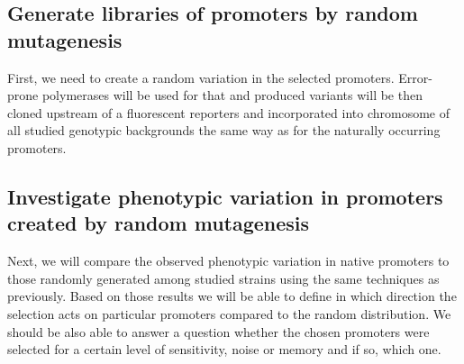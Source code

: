 \subsection{Generate libraries of promoters by random mutagenesis}
First, we need to create a random variation in the selected promoters.
Error-prone polymerases will be used for that and produced variants will be then cloned upstream of a fluorescent reporters and incorporated into chromosome of all studied genotypic backgrounds the same way as for the naturally occurring promoters.

\subsection{Investigate phenotypic variation in promoters created by random mutagenesis}
Next, we will compare the observed phenotypic variation in native promoters to those randomly generated among studied strains using the same techniques as previously.
Based on those results we will be able to define in which direction the selection acts on particular promoters compared to the random distribution.
We should be also able to answer a question whether the chosen promoters were selected for a certain level of sensitivity, noise or memory and if so, which one.


\shorthandon{-} 
